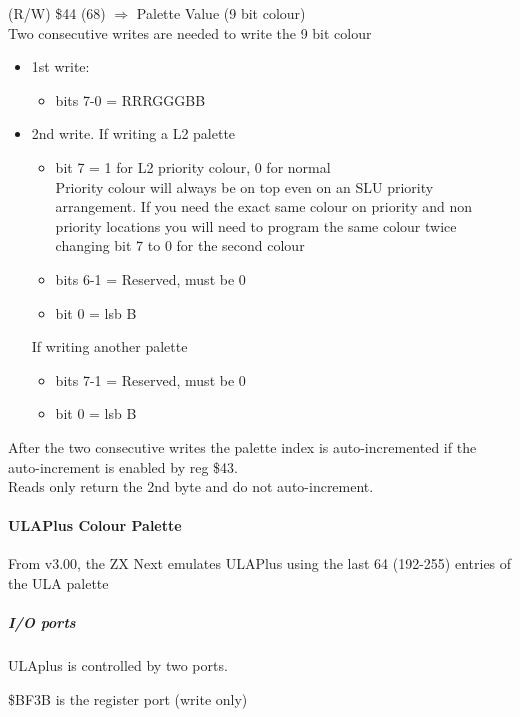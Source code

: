 (R/W) \$44 (68) $\Rightarrow$ Palette Value (9 bit colour)\\
Two consecutive writes are needed to write the 9 bit colour
\begin{itemize}
\item[] 1st write:
  \begin{itemize}
  \item[] bits 7-0 = RRRGGGBB
  \end{itemize}
\item[] 2nd write.
  If writing a L2 palette\\
  \begin{itemize}
  \item[] bit 7 = 1 for L2 priority colour, 0 for normal\\
    Priority colour will always be on top even on an SLU priority
    arrangement. If you need the exact same colour on priority and non
    priority locations you will need to program the same colour twice
    changing bit 7 to 0 for the second colour
  \item[] bits 6-1 = Reserved, must be 0
  \item[] bit 0 = lsb B
  \end{itemize}
  If writing another palette
  \begin{itemize}
  \item[] bits 7-1 = Reserved, must be 0
  \item[] bit 0 = lsb B
  \end{itemize}
\end{itemize}
After the two consecutive writes the palette index is
auto-incremented if the auto-increment is enabled by reg \$43.\\
Reads only return the 2nd byte and do not auto-increment.

\paragraph{ULAPlus Colour Palette}
From v3.00, the ZX Next emulates ULAPlus using the last 64 (192-255)
entries of the ULA palette

\subparagraph{I/O ports}
ULAplus is controlled by two ports.

\$BF3B is the register port (write only)

